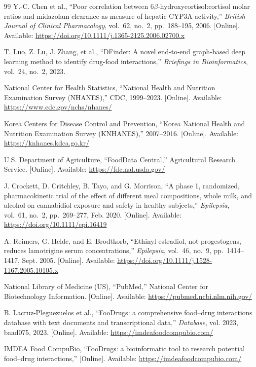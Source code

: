 \begin{thebibliography}{99}
Y.-C. Chen et al.,
``Poor correlation between 6$\beta$-hydroxycortisol:cortisol molar ratios and midazolam clearance as measure of hepatic CYP3A activity,''
\textit{British Journal of Clinical Pharmacology}, vol.~62, no.~2, pp.~188--195, 2006.
[Online]. Available: \url{https://doi.org/10.1111/j.1365-2125.2006.02700.x}

T. Luo, Z. Lu, J. Zhang, et al.,
``DFinder: A novel end-to-end graph-based deep learning method to identify drug-food interactions,''
\textit{Briefings in Bioinformatics}, vol.~24, no.~2, 2023.

National Center for Health Statistics,
``National Health and Nutrition Examination Survey (NHANES),''
CDC, 1999--2023.
[Online]. Available: \url{https://www.cdc.gov/nchs/nhanes/}

Korea Centers for Disease Control and Prevention,
``Korea National Health and Nutrition Examination Survey (KNHANES),''
2007--2016.
[Online]. Available: \url{https://knhanes.kdca.go.kr/}

U.S. Department of Agriculture,
``FoodData Central,''
Agricultural Research Service.
[Online]. Available: \url{https://fdc.nal.usda.gov/}

J. Crockett, D. Critchley, B. Tayo, and G. Morrison,
``A phase 1, randomized, pharmacokinetic trial of the effect of different meal compositions, whole milk, and alcohol on cannabidiol exposure and safety in healthy subjects,''
\textit{Epilepsia}, vol.~61, no.~2, pp.~269--277, Feb. 2020.
[Online]. Available: \url{https://doi.org/10.1111/epi.16419}

A. Reimers, G. Helde, and E. Brodtkorb,
``Ethinyl estradiol, not progestogens, reduces lamotrigine serum concentrations,''
\textit{Epilepsia}, vol.~46, no.~9, pp.~1414--1417, Sept. 2005.
[Online]. Available: \url{https://doi.org/10.1111/j.1528-1167.2005.10105.x}

National Library of Medicine (US),
``PubMed,''
National Center for Biotechnology Information.
[Online]. Available: \url{https://pubmed.ncbi.nlm.nih.gov/}

B. Lacruz-Pleguezuelos et al.,
``FooDrugs: a comprehensive food--drug interactions database with text documents and transcriptional data,''
\textit{Database}, vol. 2023, baad075, 2023.
[Online]. Available: \url{https://imdeafoodcompubio.com/}

IMDEA Food CompuBio,
``FooDrugs: a bioinformatic tool to research potential food--drug interactions,''
[Online]. Available: \url{https://imdeafoodcompubio.com/}


\end{thebibliography}
